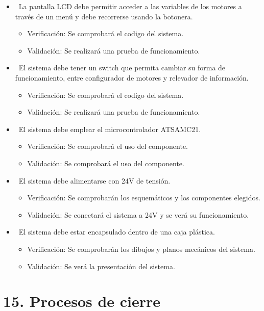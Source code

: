 \documentclass[
11pt, %
]{charter}
\begin{document}
\begin{itemize}
\begin{itemize}
	\end{itemize}
	\item \REQ ~La pantalla LCD debe permitir acceder a las variables de los motores a través de un menú y debe recorrerse usando la botonera. 
	\begin{itemize}
		\item Verificación: Se comprobará el codigo del sistema.
		\item Validación: Se realizará una prueba de funcionamiento.
	\end{itemize}
	\item \REQ ~El sistema debe tener un switch que permita cambiar su forma de funcionamiento, entre configurador de motores y relevador de información.
	\begin{itemize}
		\item Verificación: Se comprobará el codigo del sistema.
		\item Validación: Se realizará una prueba de funcionamiento.
	\end{itemize}
	\item \REQ ~El sistema debe emplear el microcontrolador ATSAMC21.
	\begin{itemize}
		\item Verificación: Se comprobará el uso del componente.
		\item Validación: Se comprobará el uso del componente.
	\end{itemize}
	\item \REQ ~El sistema debe alimentarse con 24V de tensión.
	\begin{itemize}
		\item Verificación: Se comprobarán los esquemáticos y los componentes elegidos.
		\item Validación: Se conectará el sistema a 24V y se verá su funcionamiento.
	\end{itemize}
	\item \REQ ~El sistema debe estar encapsulado dentro de una caja plástica.
	\begin{itemize}
		\item Verificación: Se comprobarán los dibujos y planos mecánicos del sistema.
		\item Validación: Se verá la presentación del sistema.
	\end{itemize}
\end{itemize}
		
\section{15. Procesos de cierre}    
\label{sec:cierre}
\end{document}
